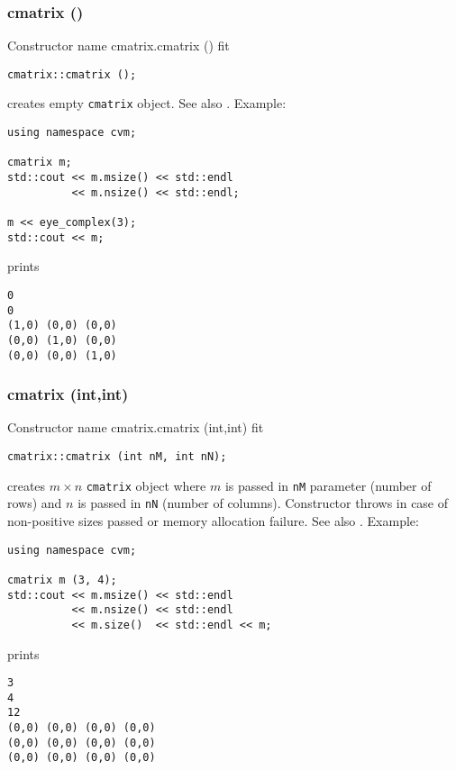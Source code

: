 \subsubsection{cmatrix ()}
Constructor%
\pdfdest name {cmatrix.cmatrix ()} fit
\begin{verbatim}
cmatrix::cmatrix ();
\end{verbatim}
creates  empty \verb"cmatrix" object.
See also .
Example:
\begin{Verbatim}
using namespace cvm;

cmatrix m;
std::cout << m.msize() << std::endl 
          << m.nsize() << std::endl;

m << eye_complex(3);
std::cout << m;
\end{Verbatim}
prints
\begin{Verbatim}
0
0
(1,0) (0,0) (0,0)
(0,0) (1,0) (0,0)
(0,0) (0,0) (1,0)
\end{Verbatim}
\newpage



\subsubsection{cmatrix (int,int)}
Constructor%
\pdfdest name {cmatrix.cmatrix (int,int)} fit
\begin{verbatim}
cmatrix::cmatrix (int nM, int nN);
\end{verbatim}
creates  $m\times n$ \verb"cmatrix" object where $m$ is passed in
\verb"nM" parameter (number of rows) and $n$ is passed in
\verb"nN" (number of columns).
Constructor throws  
in case of non-positive sizes passed or memory allocation failure.
See also .
Example:
\begin{Verbatim}
using namespace cvm;

cmatrix m (3, 4);
std::cout << m.msize() << std::endl 
          << m.nsize() << std::endl 
          << m.size()  << std::endl << m;
\end{Verbatim}
prints
\begin{Verbatim}
3
4
12
(0,0) (0,0) (0,0) (0,0)
(0,0) (0,0) (0,0) (0,0)
(0,0) (0,0) (0,0) (0,0)
\end{Verbatim}
\newpage




